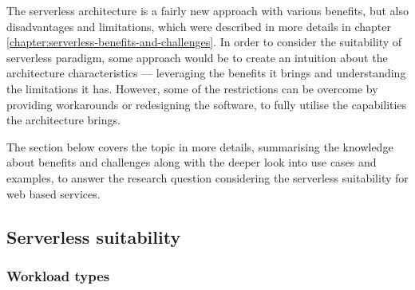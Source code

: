 The serverless architecture is a fairly new approach with various benefits, but also disadvantages and limitations, which were described in more details in chapter \ref{chapter:serverless-benefits-and-challenges}.
In order to consider the suitability of serverless paradigm, some approach would be to create an intuition about the architecture characteristics --- leveraging the benefits it brings and understanding the limitations it has.
However, some of the restrictions can be overcome by providing workarounds or redesigning the software, to fully utilise the capabilities the architecture brings.

The section below covers the topic in more details, summarising the knowledge about benefits and challenges along with the deeper look into use cases and examples, to answer the research question considering the serverless suitability for web based services.



\subsection{Serverless suitability}

\subsubsection{Workload types}

